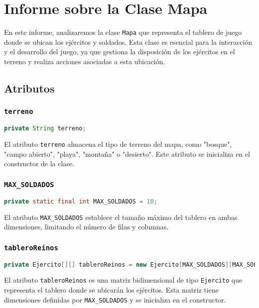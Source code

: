 \section{Informe sobre la Clase Mapa}

En este informe, analizaremos la clase \texttt{Mapa} que representa el tablero de juego donde se ubican los ejércitos y soldados. Esta clase es esencial para la interacción y el desarrollo del juego, ya que gestiona la disposición de los ejércitos en el terreno y realiza acciones asociadas a esta ubicación.

\subsection{Atributos}

\subsubsection{\texttt{terreno}}
\begin{lstlisting}[language=Java]
private String terreno;
\end{lstlisting}
El atributo \texttt{terreno} almacena el tipo de terreno del mapa, como "bosque", "campo abierto", "playa", "montaña" o "desierto". Este atributo se inicializa en el constructor de la clase.

\subsubsection{\texttt{MAX\_SOLDADOS}}
\begin{lstlisting}[language=Java]
private static final int MAX_SOLDADOS = 10;
\end{lstlisting}
El atributo \texttt{MAX\_SOLDADOS} establece el tamaño máximo del tablero en ambas dimensiones, limitando el número de filas y columnas.

\subsubsection{\texttt{tableroReinos}}
\begin{lstlisting}[language=Java]
private Ejercito[][] tableroReinos = new Ejercito[MAX_SOLDADOS][MAX_SOLDADOS];
\end{lstlisting}
El atributo \texttt{tableroReinos} es una matriz bidimensional de tipo \texttt{Ejercito} que representa el tablero donde se ubicarán los ejércitos. Esta matriz tiene dimensiones definidas por \texttt{MAX\_SOLDADOS} y se inicializa en el constructor.

